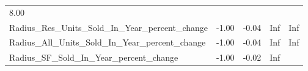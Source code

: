 \documentclass[]{article}
\begin{document}
\begin{longtable}[]{@{}lllll@{}}
\begin{minipage}[t]{0.11\columnwidth}
8.00\strut
\end{minipage}\tabularnewline
\begin{minipage}[t]{0.49\columnwidth}\raggedright\strut
Radius\_Res\_Units\_Sold\_In\_Year\_percent\_change\strut
\end{minipage} & \begin{minipage}[t]{0.08\columnwidth}\raggedright\strut
-1.00\strut
\end{minipage} & \begin{minipage}[t]{0.09\columnwidth}\raggedright\strut
-0.04\strut
\end{minipage} & \begin{minipage}[t]{0.09\columnwidth}\raggedright\strut
Inf\strut
\end{minipage} & \begin{minipage}[t]{0.11\columnwidth}\raggedright\strut
Inf\strut
\end{minipage}\tabularnewline
\begin{minipage}[t]{0.49\columnwidth}\raggedright\strut
Radius\_All\_Units\_Sold\_In\_Year\_percent\_change\strut
\end{minipage} & \begin{minipage}[t]{0.08\columnwidth}\raggedright\strut
-1.00\strut
\end{minipage} & \begin{minipage}[t]{0.09\columnwidth}\raggedright\strut
-0.04\strut
\end{minipage} & \begin{minipage}[t]{0.09\columnwidth}\raggedright\strut
Inf\strut
\end{minipage} & \begin{minipage}[t]{0.11\columnwidth}\raggedright\strut
Inf\strut
\end{minipage}\tabularnewline
\begin{minipage}[t]{0.49\columnwidth}\raggedright\strut
Radius\_SF\_Sold\_In\_Year\_percent\_change\strut
\end{minipage} & \begin{minipage}[t]{0.08\columnwidth}\raggedright\strut
-1.00\strut
\end{minipage} & \begin{minipage}[t]{0.09\columnwidth}\raggedright\strut
-0.02\strut
\end{minipage} & \begin{minipage}[t]{0.09\columnwidth}\raggedright\strut
Inf\strut
\end{minipage} & \begin{minipage}[t]{0.11\columnwidth}\raggedright\strut

\end{minipage}
\end{longtable}
\end{document}
